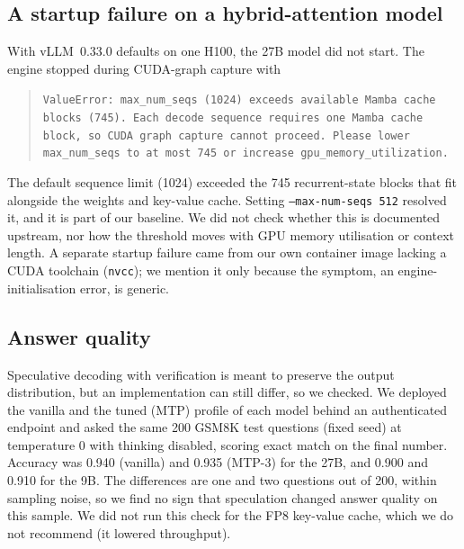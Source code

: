 \documentclass[11pt]{article}
\begin{document}
\subsection{A startup failure on a hybrid-attention model}\label{sec:startup}
With vLLM~0.33.0 defaults on one H100, the 27B model did not start. The engine stopped during CUDA-graph capture with
\begin{quote}\small\texttt{ValueError: max\_num\_seqs (1024) exceeds available Mamba cache blocks (745). Each decode sequence requires one Mamba cache block, so CUDA graph capture cannot proceed. Please lower max\_num\_seqs to at most 745 or increase gpu\_memory\_utilization.}\end{quote}
The default sequence limit (1024) exceeded the 745 recurrent-state blocks that fit alongside the weights and key-value cache. Setting \texttt{--max-num-seqs 512} resolved it, and it is part of our baseline.
We did not check whether this is documented upstream, nor how the threshold moves with GPU memory utilisation or context length.
A separate startup failure came from our own container image lacking a CUDA toolchain (\texttt{nvcc}); we mention it only because the symptom, an engine-initialisation error, is generic.

\subsection{Answer quality}\label{sec:quality}
Speculative decoding with verification is meant to preserve the output distribution, but an implementation can still differ, so we checked. We deployed the vanilla and the tuned (MTP) profile of each model behind an authenticated endpoint and asked the same 200 GSM8K test questions (fixed seed) at temperature 0 with thinking disabled, scoring exact match on the final number. Accuracy was 0.940 (vanilla) and 0.935 (MTP-3) for the 27B, and 0.900 and 0.910 for the 9B. The differences are one and two questions out of 200, within sampling noise, so we find no sign that speculation changed answer quality on this sample. We did not run this check for the FP8 key-value cache, which we do not recommend (it lowered throughput).
\end{document}
